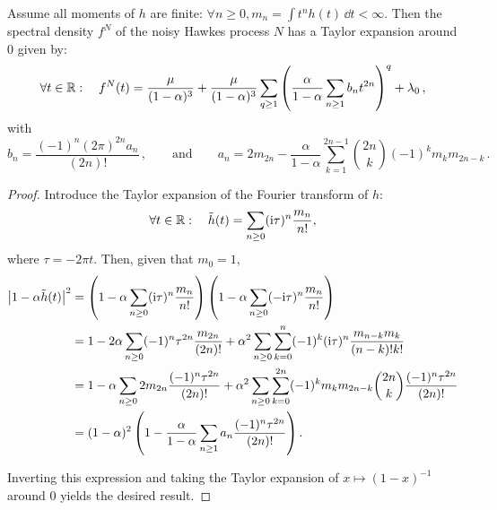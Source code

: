 \begin{subappendices}
\begin{lemma}\label{lemma:taylor}
Assume all moments of $h$ are finite: $\forall n \ge 0, m_n = \int t^n h(t) \, \dd t < \infty$.
Then
the spectral density $f^N$ of the noisy Hawkes process $N$ has a Taylor expansion around $0$ given by:
\begin{equation}\label{eq:chap4_taylor}
\forall t \in {\mathbb R}: \quad
  f^N(t) = \frac{\mu}{(1-\alpha)^3} + \frac{\mu}{(1-\alpha)^3} \sum_{q \ge 1} \left( \frac{\alpha}{1 - \alpha} \sum_{n \ge 1} b_n t^{2n} \right)^q + \lambda_0 \,,
\end{equation}
with 
\begin{equation}\label{eq:chap4_taylor_an_bn}
  b_n = \frac{(-1)^n (2\pi)^{2n} a_n}{(2n)!} \,, \qquad \text{and} \qquad
  a_n = 2 m_{2n} - \frac{\alpha}{1 - \alpha} \sum_{k=1}^{2n-1} \binom{2n}{k} (-1)^k m_k m_{2n-k} \,.
\end{equation}
\end{lemma}
\begin{proof}
Introduce the Taylor expansion of the Fourier transform of $h$:
\begin{equation*}
\forall t \in {\mathbb R}: \quad
  \tilde h(t) = \sum_{n \ge 0} (\mathrm{i} \tau)^n \frac{m_n}{n!},
\end{equation*}
where $\tau = -2 \pi t$.
Then, given that $m_0=1$,
\begin{align*}
  \left \lvert 1 - \alpha \tilde h(t) \right \rvert^2 
  &= \left( 1 - \alpha \sum_{n \ge 0} (\mathrm{i} \tau)^n \frac{m_n}{n!} \right) \left( 1 - \alpha \sum_{n \ge 0} (-\mathrm{i} \tau)^n \frac{m_n}{n!} \right)\\
  &= 1 - 2 \alpha \sum_{n \ge 0} (-1)^n \tau^{2n} \frac{m_{2n}}{(2n)!} + \alpha^2 \sum_{n \ge 0} \sum_{k=0}^n (-1)^k (\mathrm{i} \tau)^n \frac{m_{n-k}m_k}{(n-k)!k!}\\
  &= 1 - \alpha \sum_{n \ge 0} 2 m_{2n} \frac{(-1)^n \tau^{2n}}{(2n)!} + \alpha^2 \sum_{n \ge 0} \sum_{k=0}^{2n} (-1)^k m_k m_{2n-k} \binom{2n}{k} \frac{(-1)^n \tau^{2n}}{(2n)!}\\
  &= (1 - \alpha)^2 \left( 1 - \frac{\alpha}{1 - \alpha} \sum_{n \ge 1} a_n \frac{(-1)^n \tau^{2n}}{(2n)!} \right).
\end{align*}

Inverting this expression and taking the Taylor expansion of $x \mapsto (1 - x)^{-1}$ around 0 yields the desired result.
\end{proof}


\end{subappendices}
